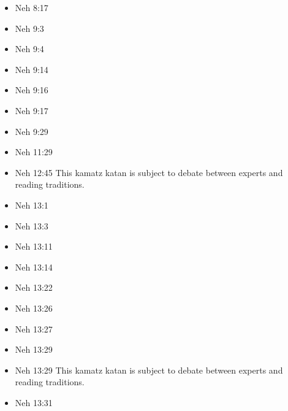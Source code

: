 \documentclass[14pt]{book}
\begin{document}
\begin{multicols}{2}
\begin{itemize}
						\item Neh 8:17
						
						\item Neh 9:3
						
						\item Neh 9:4
						
						\item Neh 9:14
						
						\item Neh 9:16
						
						\item Neh 9:17
						
						\item Neh 9:29
						
						\item Neh 11:29
						
						\item Neh 12:45 This kamatz katan is subject to debate between experts and reading traditions.
						
						\item Neh 13:1
						
						\item Neh 13:3
						
						\item Neh 13:11
						
						\item Neh 13:14
						
						\item Neh 13:22
						
						\item Neh 13:26
						
						\item Neh 13:27
						
						\item Neh 13:29
						
						\item Neh 13:29 This kamatz katan is subject to debate between experts and reading traditions.
						
						\item Neh 13:31
						
	\end{itemize}\end{multicols}
\end{document}
